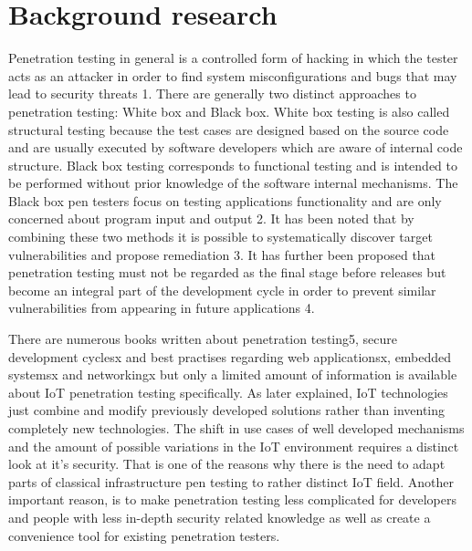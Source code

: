 
\section{Background research}

Penetration testing in general is a controlled form of hacking in which the tester acts as an attacker in order to find system misconfigurations and bugs that may lead to security threats {1}. There are generally two distinct approaches to penetration testing: White box and Black box. White box testing is also called structural testing because the test cases are designed based on the source code and are usually executed by software developers which are aware of internal code structure. Black box testing corresponds to functional testing and is intended to be performed without prior knowledge of the software internal mechanisms. The Black box pen testers focus on testing applications functionality and are only concerned about program input and output {2}. It has been noted that by combining these two methods it is possible to systematically discover target vulnerabilities and propose remediation {3}. It has further been proposed that penetration testing must not be regarded as the final stage before releases but become an integral part of the development cycle in order to prevent similar vulnerabilities from appearing in future applications {4}. 

There are numerous books written about penetration testing{5}, secure development cycles{x} and best practises regarding web applications{x}, embedded systems{x} and networking{x} but only a limited amount of information is available about IoT penetration testing specifically\cite{cookbook}. As later explained, IoT technologies just combine and modify previously developed solutions rather than inventing completely new technologies. The shift in use cases of well developed mechanisms and the amount of possible variations in the IoT environment requires a distinct look at it's security. That is one of the reasons why there is the need to adapt parts of classical infrastructure pen testing to rather distinct IoT field. Another important reason, is to make penetration testing less complicated for developers and people with less in-depth security related knowledge as well as create a convenience tool for existing penetration testers.


